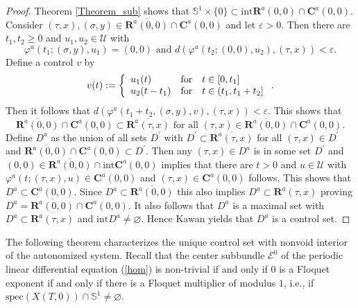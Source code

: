 \documentclass{siamltex}%
\begin{document}
\begin{proof}
Theorem \ref{Theorem_sub} shows that $\mathbb{S}^{1}\times\{0\}\subset
\mathrm{int}\mathbf{R}^{a}(0,0)\cap\mathbf{C}^{a}(0,0)$. Consider
$(\tau,x),(\sigma,y)\in\overline{\mathbf{R}^{a}(0,0)}\cap\mathbf{C}^{a}(0,0)$
and let $\varepsilon>0$. Then there are $t_{1},t_{2}\geq0$ and $u_{1},u_{2}%
\in\mathcal{U}$ with
\[
\varphi^{a}(t_{1};(\sigma,y),u_{1})=(0,0)\text{ and }d(\varphi^{a}%
(t_{2};(0,0),u_{2}),(\tau,x))<\varepsilon.
\]
Define a control $v$ by%
\[
v(t):=\left\{
\begin{array}
[c]{lll}%
u_{1}(t) & \text{for} & t\in\lbrack0,t_{1}]\\
u_{2}(t-t_{1}) & \text{for} & t\in(t_{1},t_{1}+t_{2}]
\end{array}
\right.  .
\]
Then it follows that $d(\varphi^{a}(t_{1}+t_{2},(\sigma,y),v),(\tau
,x))<\varepsilon$. This shows that%
\begin{equation}
\overline{\mathbf{R}^{a}(0,0)}\cap\mathbf{C}^{a}(0,0)\subset\overline
{\mathbf{R}^{a}(\tau,x)}\text{ for all }(\tau,x)\in\overline{\mathbf{R}%
^{a}(0,0)}\cap\mathbf{C}^{a}(0,0). \label{4.9}%
\end{equation}
Define $D^{a}$ as the union of all sets $D^{\prime}$ with $D^{\prime}%
\subset\overline{\mathbf{R}^{a}(\tau,x)}$ for all $(\tau,x)\in D^{\prime}$ and
$\overline{\mathbf{R}^{a}(0,0)}\cap\mathbf{C}^{a}(0,0)\subset D^{\prime}$.
Then any $(\tau,x)\in D^{a}$ is in some set $D^{\prime}$ and $(0,0)\in
\overline{\mathbf{R}^{a}(0,0)}\cap\mathrm{int}\mathbf{C}^{a}(0,0)$ implies
that there are $t>0$ and $u\in\mathcal{U}$ with $\varphi^{a}(t;(\tau
,x),u)\in\mathbf{C}^{a}(0,0)$ and $(\tau,x)\in\mathbf{C}^{a}(0,0)$ follows.
This shows that $D^{a}\subset\mathbf{C}^{a}(0,0)$. Since $D^{a}\subset
\overline{\mathbf{R}^{a}(0,0)}$ this also implies $D^{a}\subset\overline
{\mathbf{R}^{a}(\tau,x)}$ proving $D^{a}=\overline{\mathbf{R}^{a}(0,0)}%
\cap\mathbf{C}^{a}(0,0)$. It also follows that $D^{a}$ is a maximal set with
$D^{a}\subset\overline{\mathbf{R}^{a}(\tau,x)}$ and $\mathrm{int}D^{a}%
\not =\varnothing$. Hence Kawan \cite[Proposition 1.20]{Kawa13} yields that
$D^{a}$ is a control set.
\end{proof}

The following theorem characterizes the unique control set with nonvoid
interior of the autonomized system. Recall that the center subbundle
$\mathcal{E}^{0}$ of the periodic linear differential equation (\ref{hom}) is
non-trivial if and only if $0$ is a Floquet exponent if and only if there is a
Floquet multiplier of modulus $1$, i.e., if $\mathrm{spec}(X(T,0))\cap
\mathbb{S}^{1}\not =\varnothing$.
\end{document}
